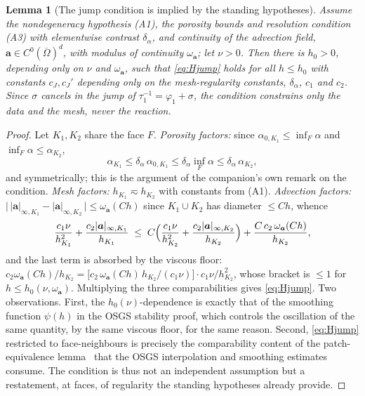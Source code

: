 \documentclass[11pt]{article}
\newtheorem{lemma}[theorem]{Lemma}
\theoremstyle{remark}
\newcommand{\ba}{\boldsymbol{a}}
\begin{document}
\begin{lemma}[The jump condition is implied by the standing hypotheses]
\label{lem:jumpauto}
Assume the nondegeneracy hypothesis (A1), the porosity bounds and resolution
condition (A3) with elementwise contrast $\delta_\alpha$, and continuity of the
advection field, $\ba \in C^0(\overline\Omega)^d$, with modulus of continuity
$\omega_{\ba}$; let $\nu > 0$. Then there is $h_0 > 0$, depending only on $\nu$ and
$\omega_{\ba}$, such that \cref{eq:Hjump} holds for all $h \le h_0$ with constants
$c_J, c_J'$ depending only on the mesh-regularity constants, $\delta_\alpha$, $c_1$
and $c_2$. Since $\sigma$ cancels in the jump of $\tau_1^{-1} = \varphi_1 + \sigma$,
the condition constrains only the data and the mesh, never the reaction.
\end{lemma}

\begin{proof}
Let $K_1, K_2$ share the face $F$. \emph{Porosity factors:} since
$\alpha_{0,K_1} \le \inf_F \alpha$ and $\inf_F\alpha \le \alpha_{K_2}$,
\[
  \alpha_{K_1} \le \delta_\alpha\,\alpha_{0,K_1}
  \le \delta_\alpha \inf_F \alpha \le \delta_\alpha\,\alpha_{K_2},
\]
and symmetrically; this is the argument of the companion's own remark on the
condition. \emph{Mesh factors:} $h_{K_1} \eqsim h_{K_2}$ with constants from (A1).
\emph{Advection factors:} $\bigl|\,|\ba|_{\infty,K_1} - |\ba|_{\infty,K_2}\,\bigr|
\le \omega_{\ba}(C h)$ since $K_1 \cup K_2$ has diameter $\le Ch$, whence
\[
  \frac{c_1\nu}{h_{K_1}^2} + \frac{c_2|\ba|_{\infty,K_1}}{h_{K_1}}
  \;\le\; C\Bigl( \frac{c_1\nu}{h_{K_2}^2}
  + \frac{c_2|\ba|_{\infty,K_2}}{h_{K_2}} \Bigr)
  + \frac{C\,c_2\,\omega_{\ba}(Ch)}{h_{K_2}},
\]
and the last term is absorbed by the viscous floor:
$c_2\omega_{\ba}(Ch)/h_{K_2} = \bigl[c_2\,\omega_{\ba}(Ch)\,h_{K_2}/(c_1\nu)\bigr]
\cdot c_1\nu/h_{K_2}^2$, whose bracket is $\le 1$ for
$h \le h_0(\nu, \omega_{\ba})$. Multiplying the three comparabilities gives
\cref{eq:Hjump}. Two observations. First, the $h_0(\nu)$-dependence is exactly that
of the smoothing function $\psi(h)$ in the OSGS stability proof, which controls the
oscillation of the same quantity, by the same viscous floor, for the same reason.
Second, \cref{eq:Hjump} restricted to face-neighbours is precisely the comparability
content of the patch-equivalence lemma~\cite[Lemma~4.2]{OSGSnote} that the OSGS
interpolation and smoothing estimates consume. The condition is thus not an
independent assumption but a restatement, at faces, of regularity the standing
hypotheses already provide.
\end{proof}
\end{document}
